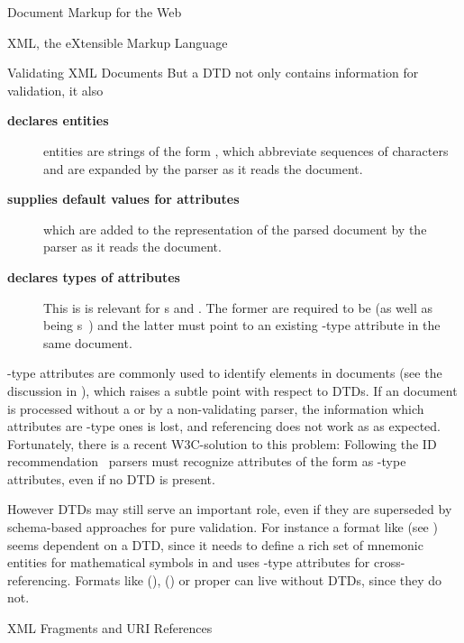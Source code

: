 \begin{tchapter}[id=markup-web]{Document Markup for the Web}
\begin{tsection}[id=xml]{XML, the eXtensible Markup Language}
\begin{tsubsection}[id=xml-validation,short=Validating XML Doucments]{Validating XML Documents}
  But a DTD not only contains information for validation, it also
  \begin{description}
  \item[{\bf{declares {\xml} entities}}] {\xml} entities are strings of
    the form {\snippet{\&}\snippet{;}}, which abbreviate sequences of
    {\unicode} characters and are expanded by the parser as it reads the document.
  \item[{\bf{supplies default values for attributes}}] which are added to the
    representation of the parsed document by the parser as it reads the document.
  \item[{\bf{declares types of attributes}}] This is is relevant for
    {s} {} and {}. The former are
    required to be {} (as well as being {\xml}
    {s~\cite[section 2.3]{Bray:XML97}}) and the latter must point to
    an existing {}-type attribute in the same document.
  \end{description}
  {}-type attributes are commonly used to identify elements in {\xml}
  documents (see the discussion in {}), which raises a subtle
  point with respect to DTDs. If an {\xml} document is processed without a
  {} or by a non-validating parser, the information
  which attributes are {}-type ones is lost, and referencing does not work as
  as expected. Fortunately, there is a recent W3C-solution to this problem: Following the
  {\xml} ID recommendation~\cite{XML:id05} {\xml} parsers must recognize attributes of the
  form {} as {}-type attributes, even if no
  DTD is present.

  However DTDs may still serve an important role, even if they are superseded by schema-based
  approaches for pure validation. For instance a format like {\pmathml} (see
  {}) seems dependent on a DTD, since it needs to define a
  rich set of mnemonic entities for mathematical symbols in
  {\unicode} and uses {}-type attributes for cross-referencing. Formats like
  {\cmathml} ({}), {\openmath}
  () or {\omdoc} proper can live without DTDs, since they
  do not.
\end{tsubsection}

\begin{tsubsection}[id=xml-fragments]{XML Fragments and URI References}


\end{tsubsection}
\end{tsection}
\end{tchapter}
